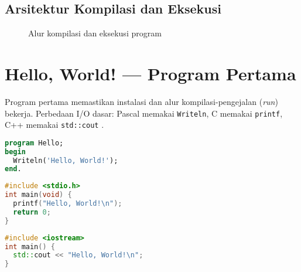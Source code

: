 \documentclass[../main.tex]{subfiles}
\begin{document}
\subsection{Arsitektur Kompilasi dan Eksekusi}
\begin{figure}[h]
  \centering
  \caption{Alur kompilasi dan eksekusi program}
  \label{fig:compile-run}
\end{figure}

\section{Hello, World! — Program Pertama}
Program pertama memastikan instalasi dan alur kompilasi-pengejalan (\emph{run}) bekerja. Perbedaan I/O dasar: Pascal memakai \texttt{Writeln}, C memakai \texttt{printf}, C++ memakai \texttt{std::cout} \parencite{w3pascal-io,gnu-c-manual,cpp-reference}.

\begin{lstlisting}[language=Pascal, caption={Hello World pada Pascal}]
program Hello;
begin
  Writeln('Hello, World!');
end.
\end{lstlisting}

\begin{lstlisting}[language=C, caption={Hello World pada C}]
#include <stdio.h>
int main(void) {
  printf("Hello, World!\n");
  return 0;
}
\end{lstlisting}

\begin{lstlisting}[language=C++, caption={Hello World pada C++}]
#include <iostream>
int main() {
  std::cout << "Hello, World!\n";
}
\end{lstlisting}
\end{document}
